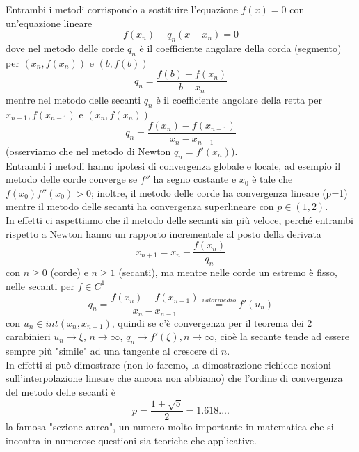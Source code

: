 \documentclass[12pt]{article}
\begin{document}
Entrambi i metodi corrispondo a sostituire l'equazione $f(x)=0$ con un'equazione lineare
\begin{equation*}
    f(x_n)+q_n(x-x_n)=0
\end{equation*}
dove nel metodo delle corde $q_n$ è il coefficiente angolare della corda (segmento) per $(x_n,f(x_n))$ e $(b,f(b))$
\begin{equation*}
    q_n=\frac{f(b)-f(x_n)}{b-x_n}
\end{equation*}
mentre nel metodo delle secanti $q_n$ è il coefficiente angolare della retta per $x_{n-1},f(x_{n-1})$ e $(x_n,f(x_n))$
\begin{equation*}
    q_n=\frac{f(x_n)-f(x_{n-1})}{x_n-x_{n-1}}
\end{equation*}
(osserviamo che nel metodo di Newton $q_n=f'(x_n)$).\\Entrambi i metodi hanno ipotesi di convergenza globale e locale, ad esempio il metodo delle corde converge se $f''$ ha segno costante e $x_0$ è tale che $f(x_0)f''(x_0)>0$; inoltre, il metodo delle corde ha convergenza lineare (p=1) mentre il metodo delle secanti ha convergenza superlineare con $p\in(1,2)$. \\In effetti ci aspettiamo che il metodo delle secanti sia più veloce, perché entrambi rispetto a Newton hanno un rapporto incrementale al posto della derivata
\begin{equation*}
    x_{n+1}=x_n-\frac{f(x_n)}{q_n}
\end{equation*}
con $n\geq0$ (corde) e $n\geq1$ (secanti), ma mentre nelle corde un estremo è fisso, nelle secanti per $f\in C^1$
\begin{equation*}
    q_n=\frac{f(x_n)-f(x_{n-1})}{x_n-x_{n-1}}\overset{valor medio}{=} f'(u_n)
\end{equation*}
con $u_n\in int(x_n,x_{n-1})$, quindi se c'è convergenza per il teorema dei 2 carabinieri $u_n\rightarrow\xi$, $n\rightarrow\infty$, $q_n \rightarrow f'(\xi), n\rightarrow\infty$, cioè la secante tende ad essere sempre più "simile" ad una tangente al crescere di $n$.\\In effetti si può dimostrare (non lo faremo, la dimostrazione richiede nozioni sull'interpolazione lineare che ancora non abbiamo) che l'ordine di convergenza del metodo delle secanti è
\begin{equation*}
    p=\frac{1+\sqrt{5}}{2}=1.618....
\end{equation*}
la famosa "sezione aurea", un numero molto importante in matematica che si incontra in numerose questioni sia teoriche che applicative.\\
\end{document}
